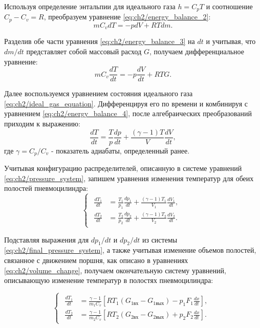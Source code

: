 Используя определение энтальпии для идеального газа $h = C_pT$ и соотношение $C_p - C_v = R$, преобразуем уравнение \eqref{eq:ch2/energy_balance_2}:
\begin{equation}\label{eq:ch2/energy_balance_3}
    mC_vdT = -pdV + RTdm.
\end{equation}

Разделив обе части уравнения \eqref{eq:ch2/energy_balance_3} на $dt$ и учитывая, что $dm/dt$ представляет собой массовый расход $G$, получаем дифференциальное уравнение:
\begin{equation}\label{eq:ch2/energy_balance_4}
    mC_v\frac{dT}{dt} = -p\frac{dV}{dt} + RTG.
\end{equation}

Далее воспользуемся уравнением состояния идеального газа \eqref{eq:ch2/ideal_gas_equation}. Дифференцируя его по времени и комбинируя с уравнением \eqref{eq:ch2/energy_balance_4}, после алгебраических преобразований приходим к выражению:
\begin{equation}\label{eq:ch2/energy_balance_5}
    \frac{dT}{dt} = \frac{T}{p}\frac{dp}{dt} + \frac{(\gamma-1)T}{V}\frac{dV}{dt},
\end{equation}
где $\gamma = C_p/C_v$ - показатель адиабаты, определенный ранее.

Учитывая конфигурацию распределителей, описанную в системе уравнений \eqref{eq:ch2/pressure_system}, запишем уравнения изменения температур для обеих полостей пневмоцилиндра:
\begin{equation}\label{eq:ch2/energy_balance_6}
    \begin{cases}
        \begin{aligned}
            \frac{dT_1}{dt} & = \frac{T_1}{p_1}\frac{dp_1}{dt} + \frac{(\gamma-1)T_1}{V_1}\frac{dV_1}{dt}, \\
            \frac{dT_2}{dt} & = \frac{T_2}{p_2}\frac{dp_2}{dt} + \frac{(\gamma-1)T_2}{V_2}\frac{dV_2}{dt}.
        \end{aligned}
    \end{cases}
\end{equation}

Подставляя выражения для $dp_1/dt$ и $dp_2/dt$ из системы \eqref{eq:ch2/final_pressure_system}, а также учитывая изменение объемов полостей,
связанное с движением поршня, как описано в уравнениях \eqref{eq:ch2/volume_change}, получаем окончательную
систему уравнений, описывающую изменение температур в полостях пневмоцилиндра:

\begin{equation}\label{eq:ch2/energy_balance_final}
    \begin{cases}
        \begin{aligned}
            \frac{dT_1}{dt} & = \frac{\gamma-1}{m_1C_v}\left[RT_1(G_{1\text{вх}} - G_{1\text{вых}}) - p_1F_1\frac{dx}{dt}\right], \\
            \frac{dT_2}{dt} & = \frac{\gamma-1}{m_2C_v}\left[RT_2(G_{2\text{вх}} - G_{2\text{вых}}) + p_2F_2\frac{dx}{dt}\right].
        \end{aligned}
    \end{cases}
\end{equation}

